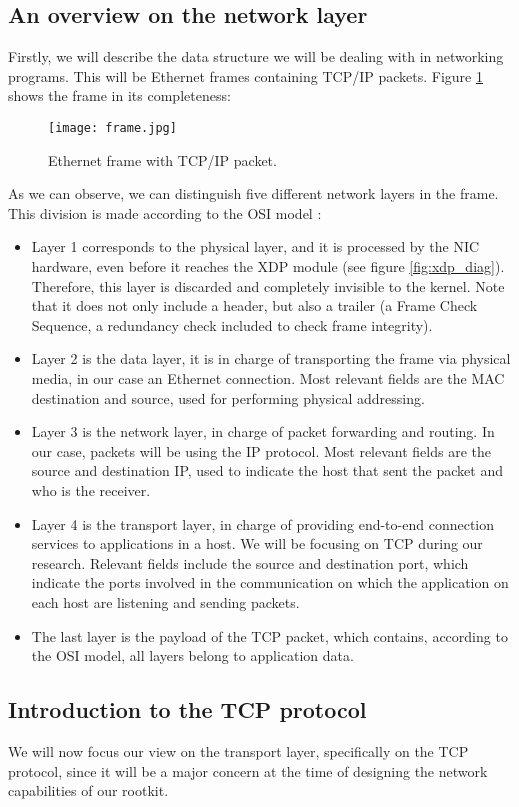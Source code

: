 \subsection{An overview on the network layer}
Firstly, we will describe the data structure we will be dealing with in networking programs. This will be Ethernet frames containing TCP/IP packets. Figure \ref{fig:frame} shows the frame in its completeness:

\begin{figure}[htbp]
	\centering
	\texttt{[image: frame.jpg]}
	\caption{Ethernet frame with TCP/IP packet.}
	\label{fig:frame}
\end{figure}

As we can observe, we can distinguish five different network layers in the frame. This division is made according to the OSI model \cite{network_layers}:
\begin{itemize}
\item Layer 1 corresponds to the physical layer, and it is processed by the NIC hardware, even before it reaches the XDP module (see figure \ref{fig:xdp_diag}). Therefore, this layer is discarded and completely invisible to the kernel. Note that it does not only include a header, but also a trailer (a Frame Check Sequence, a redundancy check included to check frame integrity).
\item Layer 2 is the data layer, it is in charge of transporting the frame via physical media, in our case an Ethernet connection. Most relevant fields are the MAC destination and source, used for performing physical addressing.
\item Layer 3 is the network layer, in charge of packet forwarding and routing. In our case, packets will be using the IP protocol. Most relevant fields are the source and destination IP, used to indicate the host that sent the packet and who is the receiver.
\item Layer 4 is the transport layer, in charge of providing end-to-end connection services to applications in a host. We will be focusing on TCP during our research. Relevant fields include the source and destination port, which indicate the ports involved in the communication on which the application on each host are listening and sending packets.
\item The last layer is the payload of the TCP packet, which contains, according to the OSI model, all layers belong to application data.
\end{itemize}


\subsection{Introduction to the TCP protocol} \label{subsection:tcp}
We will now focus our view on the transport layer, specifically on the TCP protocol, since it will be a major concern at the time of designing the network capabilities of our rootkit.

